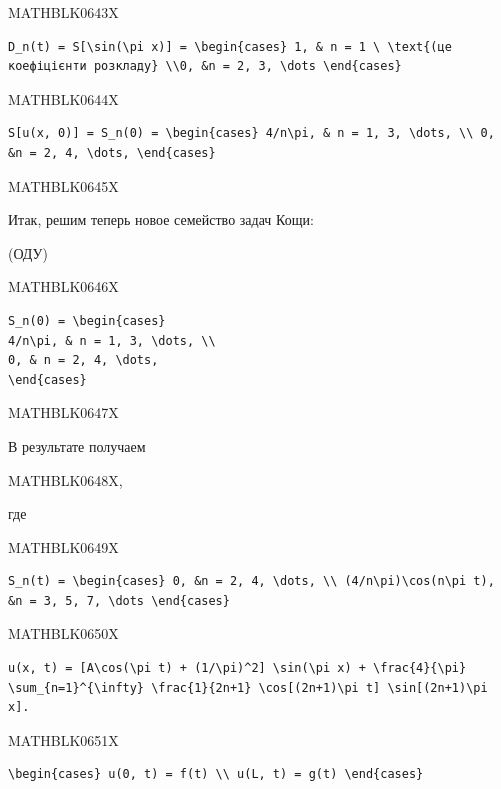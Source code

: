 \documentclass[
  ukrainian,
]{article}
\begin{document}
MATHBLK0643X

\begin{verbatim}
D_n(t) = S[\sin(\pi x)] = \begin{cases} 1, & n = 1 \ \text{(це коефіцієнти розкладу} \\0, &n = 2, 3, \dots \end{cases}
\end{verbatim}

MATHBLK0644X

\begin{verbatim}
S[u(x, 0)] = S_n(0) = \begin{cases} 4/n\pi, & n = 1, 3, \dots, \\ 0, &n = 2, 4, \dots, \end{cases}
\end{verbatim}

MATHBLK0645X

Итак, решим теперь новое семейство задач Кощи:

(ОДУ)

MATHBLK0646X

\begin{verbatim}
S_n(0) = \begin{cases}
4/n\pi, & n = 1, 3, \dots, \\
0, & n = 2, 4, \dots,
\end{cases}
\end{verbatim}

MATHBLK0647X

В результате получаем

MATHBLK0648X,

где

MATHBLK0649X

\begin{verbatim}
S_n(t) = \begin{cases} 0, &n = 2, 4, \dots, \\ (4/n\pi)\cos(n\pi t), &n = 3, 5, 7, \dots \end{cases}
\end{verbatim}

MATHBLK0650X

\begin{verbatim}
u(x, t) = [A\cos(\pi t) + (1/\pi)^2] \sin(\pi x) + \frac{4}{\pi} \sum_{n=1}^{\infty} \frac{1}{2n+1} \cos[(2n+1)\pi t] \sin[(2n+1)\pi x].
\end{verbatim}

MATHBLK0651X

\begin{verbatim}
\begin{cases} u(0, t) = f(t) \\ u(L, t) = g(t) \end{cases}
\end{verbatim}
\end{document}
